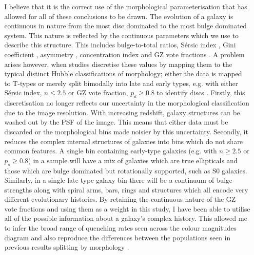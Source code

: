 I believe that it is the correct use of the morphological parameterisation that has allowed for all of these conclusions to be drawn. The evolution of a galaxy is continuous in nature from the most disc dominated to the most bulge dominated system. This nature is reflected by the continuous parameters which we use to describe this structure. This includes bulge-to-total ratios, S\'ersic index \citep{sersic68}, Gini coefficient \citep{abraham03, lotz04}, asymmetry \citep{conselice00}, concentration index \citep{morgan58} and GZ vote fractions \citep{Lintott11}. A problem arises however, when studies discretise these values by mapping them to the typical distinct Hubble classifications of morphology; either the data is mapped to T-types \citep{shimasaku01, brinchmann04, nair10b, barro15} or merely split bimodally into late and early types, e.g. with either S\'ersic index, $n \leq 2.5$ \citep{ravindranath04, kelvin12, vika15} or GZ vote fraction, $p_d \geq 0.8$ \citep{schawinski14} to identify discs . Firstly, this discretisation no longer reflects our uncertainty in the morphological classification due to the image resolution. With increasing redshift, galaxy structures can be washed out by the PSF of the image. This means that either data must be discarded or the morphological bins made noisier by this uncertainty. Secondly, it reduces the complex internal structures of galaxies into bins which do not share common features. A single bin containing early-type galaxies (e.g. with $n \geq 2.5$ or $p_s \geq 0.8$) in a sample will have a mix of galaxies which are true ellipticals and those which are bulge dominated but rotationally supported, such as S0 galaxies. Similarly, in a single late-type galaxy bin there will be a continuum of bulge strengths along with spiral arms, bars, rings and structures which all encode very different evolutionary histories. By retaining the continuous nature of the GZ vote fractions and using them as a weight in this study, I have been able to utilise all of the possible information about a galaxy's complex history. This allowed me to infer the broad range of quenching rates seen across the colour magnitudes diagram and also reproduce the differences between the populations seen in previous results splitting by morphology \citep[e.g. ]{schawinski14}.

